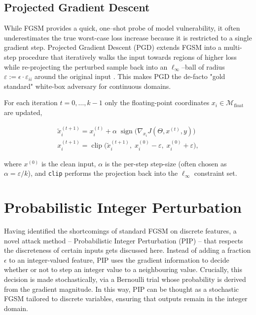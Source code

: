 \subsection{Projected Gradient Descent}

While FGSM provides a quick, one–shot probe of model vulnerability, it often underestimates the true  worst-case loss increase because it is restricted to a single gradient step.  Projected Gradient Descent (PGD) extends FGSM into a multi-step procedure that iteratively walks the input towards regions of higher loss while re-projecting the perturbed sample back into an $\ell_{\infty}$–ball of radius $\varepsilon:=\epsilon\cdot\varepsilon_{ii}$ around the original input \cite{madry2019deeplearningmodelsresistant}. This makes PGD the de-facto "gold standard" white-box adversary for continuous domains.

For each iteration $t\!=\!0,\dots,k{-}1$ only the floating-point coordinates
$x_i\!\in\!\mathcal{M}_{\text{float}}$ are updated,

\begin{equation}
\begin{aligned}
\tilde{x}^{(t+1)}_i = x^{(t)}_i
        + \alpha \;\operatorname{sign}\!\bigl(\nabla_{x_i} J(\Theta,x^{(t)},y)\bigr) \\
x^{(t+1)}_i  = \operatorname{clip}\!\bigl(
          \tilde{x}^{(t+1)}_i,\;
          x^{(0)}_i - \varepsilon,\;
          x^{(0)}_i + \varepsilon
        \bigr),                                         
\label{eq:pgd_update}
\end{aligned}
\end{equation}

where $x^{(0)}$ is the clean input, $\alpha$ is the per-step step-size
(often chosen as $\alpha=\varepsilon/k$), and \texttt{clip} performs the projection back into the $\ell_{\infty}$ constraint set.


\section{Probabilistic Integer Perturbation}
\label{sec:intprob_methodology}

Having identified the shortcomings of standard FGSM on discrete features, a novel attack method – Probabilistic Integer Perturbation (PIP) – that respects the discreteness of certain inputs gets discussed here. Instead of adding a fraction $\epsilon$ to an integer-valued feature, PIP uses the gradient information to decide whether or not to step an integer value to a neighbouring value. Crucially, this decision is made stochastically, via a Bernoulli trial whose probability is derived from the gradient magnitude. In this way, PIP can be thought as a stochastic FGSM tailored to discrete variables, ensuring that outputs remain in the integer domain.

